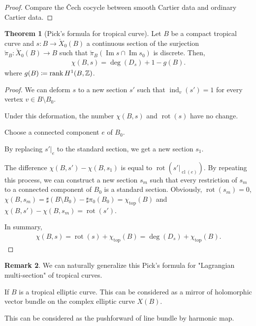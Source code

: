 \documentclass[a4paper,dvipdfmx,reqno,12pt]{amsart}
\theoremstyle{definition}
\newtheorem{Thm}{Theorem}[section]
\newtheorem{Rmk}[Thm]{Remark}
\newcommand{\deq}{\coloneqq}
\newcommand{\Z}{\mathbb{Z}}%
\newcommand{\opn}[1]{\operatorname{#1}}
\numberwithin{equation}{section}
\begin{document}
\begin{proof}
  Compare the \v{C}ech cocycle between smooth Cartier data and ordinary Cartier data.
\end{proof}

\begin{Thm}[Pick's formula for tropical curve]
  Let $B$ be a compact tropical curve and $s:B \to \check{X}_0(B)$ a continuous section of
  the surjection $\check{\pi}_{B}:\check{X}_0(B)\to B$
  such that $\check{\pi}_B(\opn{Im}s\cap \opn{Im}s_0)$ is discrete.
  Then,
  \begin{align}
    \chi(B,s)=\opn{deg}(D_s)+1-g(B).
  \end{align}
  where $g(B)\deq \rank H^{1}(B,\Z)$.
\end{Thm}

\begin{proof}



  We can deform $s$ to a new section $s'$
  such that $\opn{ind}_v(s')=1$ for every vertex $v\in B\setminus B_0$.

  Under this deformation, the number $\chi(B,s)$ and $\opn{rot}(s)$ have no change.

  Choose a connected component $e$ of $B_0$.

  By replacing $s'|_{e}$ to the standard section, we get a new section $s_1$.

  The difference $\chi(B,s')-\chi(B,s_1)$ is equal to $\opn{rot}(s'|_{\opn{cl}(e)})$. By repeating this process, we can construct a new section $s_m$ such that every
  restriction of $s_m$ to a connected component of $B_0$ is a standard section.
  Obviously, $\opn{rot}(s_m)=0$, $\chi(B,s_m)= \sharp (B\setminus B_0) -\sharp \pi_0(B_0)=\chi_{\opn{top}}(B)$ and $\chi(B,s')-\chi(B,s_m)=\opn{rot}(s')$.

  In summary,
  \begin{align}
    \chi(B,s)=\opn{rot}(s)+\chi_{\opn{top}}(B)=\opn{deg}(D_s)+\chi_{\opn{top}}(B).
  \end{align}

\end{proof}

\begin{Rmk}
  We can naturally generalize this Pick's formula for "Lagrangian multi-section" of tropical curves.

  If $B$ is a tropical elliptic curve. This can be considered as a mirror of holomorphic vector bundle on the complex elliptic curve $X(B)$.

  This can be considered as the pushforward of line bundle by harmonic map.

\end{Rmk}
\end{document}
